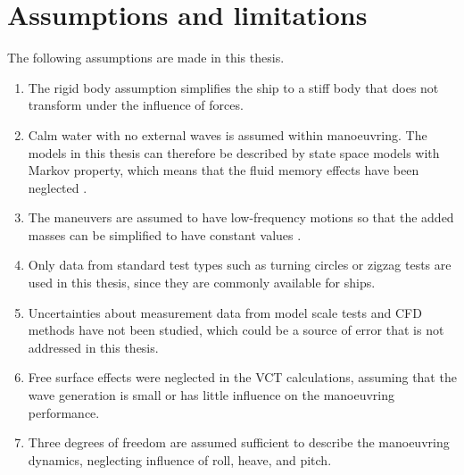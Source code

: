 \section{Assumptions and limitations}
The following assumptions are made in this thesis.
\begin{enumerate}[label=(\Roman*),itemsep=1mm]
    \item The rigid body assumption simplifies the ship to a stiff body that does not transform under the influence of forces.

    \item Calm water with no external waves is assumed within manoeuvring. The models in this thesis can therefore be described by state space models with Markov property, which means that the fluid memory effects have been neglected \cite{fossenHandbookMarineCraft2011}. 

    \item The maneuvers are assumed to have low-frequency motions so that the added masses can be simplified to have constant values \cite{fossenHandbookMarineCraft2011}.

    \item Only data from standard test types such as turning circles or zigzag tests are used in this thesis, since they are commonly available for ships. 

    \item Uncertainties about measurement data from model scale tests and CFD methods have not been studied, which could be a source of error that is not addressed in this thesis.
    
    \item Free surface effects were neglected in the VCT calculations, assuming that the wave generation is small or has little influence on the manoeuvring performance.
    
    \item Three degrees of freedom are assumed sufficient to describe the manoeuvring dynamics, neglecting influence of roll, heave, and pitch. 
        
\end{enumerate}



